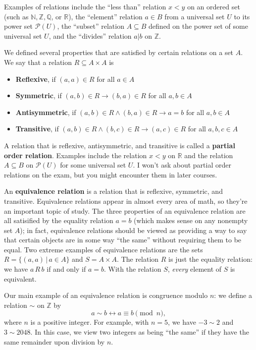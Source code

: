 \documentclass[letterpaper,12pt]{article}
\newcommand{\N}{\mathbb{N}}
\newcommand{\Z}{\mathbb{Z}}
\newcommand{\R}{\mathbb{R}}
\newcommand{\Q}{\mathbb{Q}}
\begin{document}
Examples of relations include the ``less than'' relation $x< y$ on an ordered set (such as $\N,\Z, \Q$, or $\R$), the ``element'' relation $a\in B$ from a universal set $U$ to its power set $\mathcal{P}(U)$, the ``subset'' relation $A\subseteq B$ defined on the power set of some universal set $U$, and the ``divides'' relation $a|b$ on $\Z$.

We defined several properties that are satisfied by certain relations on a set $A$. We say that a relation $R\subseteq A\times A$ is
\begin{itemize}
 \item {\bf Reflexive}, if $(a,a)\in R$ for all $a\in A$
 \item {\bf Symmetric}, if $(a,b)\in R\to (b,a)\in R$ for all $a,b\in A$
 \item {\bf Antisymmetric}, if $(a,b)\in R \wedge (b,a)\in R \to a=b$ for all $a,b\in A$
 \item {\bf Transitive}, if $(a,b)\in R \wedge (b,c)\in R \to (a,c)\in R$ for all $a,b,c\in A$
\end{itemize}
A relation that is reflexive, antisymmetric, and transitive is called a {\bf partial order relation}. Examples include the relation $x<y$ on $\R$ and the relation $A\subseteq B$ on $\mathcal{P}(U)$ for some universal set $U$. I won't ask about partial order relations on the exam, but you might encounter them in later courses.

An {\bf equivalence relation} is a relation that is reflexive, symmetric, and transitive. Equivalence relations appear in almost every area of math, so they're an important topic of study. The three properties of an equivalence relation are all satisified by the equality relation $a=b$ (which makes sense on any nonempty set $A$); in fact, equivalence relations should be viewed as providing a way to say that certain objects are in some way ``the same'' without requiring them to be equal. Two extreme examples of equivalence relations are the sets $R = \{(a,a) \,|\, a\in A\}$ and $S = A\times A$. The relation $R$ is just the equality relation: we have $a\,R\,b$ if and only if $a=b$. With the relation $S$, {\em every} element of $S$ is equivalent.

Our main example of an equivalence relation is congruence modulo $n$: we define a relation $\sim$ on $\Z$ by 
\[
 a\sim b \leftrightarrow a\equiv b\pmod{n},
\]
where $n$ is a positive integer. For example, with $n=5$, we have $-3\sim 2$ and $3\sim 2048$. In this case, we view two integers as being ``the same'' if they have the same remainder upon division by $n$.
\end{document}
